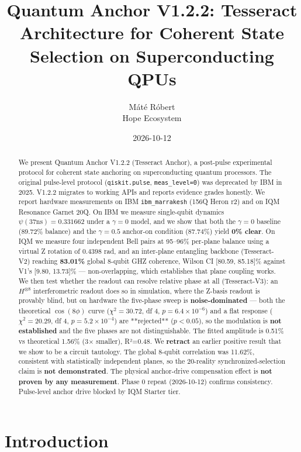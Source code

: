 \documentclass[11pt,a4paper]{article}
\title{Quantum Anchor V1.2.2: Tesseract Architecture for Coherent State Selection on Superconducting QPUs}
\author{M\'at\'e R\'obert\\Hope Ecosystem}
\date{2026-10-12}
\begin{document}
\maketitle

\begin{abstract}
We present Quantum Anchor V1.2.2 (Tesseract Anchor), a post-pulse experimental protocol for coherent state anchoring on superconducting quantum processors. The original pulse-level protocol (\texttt{qiskit.pulse}, \texttt{meas\_level=0}) was deprecated by IBM in 2025. V1.2.2 migrates to working APIs and reports evidence grades honestly. We report hardware measurements on IBM \texttt{ibm\_marrakesh} (156Q Heron r2) and on IQM Resonance Garnet 20Q. On IBM we measure single-qubit dynamics $\psi(37\text{ns}) = 0.331662$ under a $\gamma=0$ model, and we show that both the $\gamma=0$ baseline (89.72\% balance) and the $\gamma=0.5$ anchor-on condition (87.74\%) yield \textbf{0\% clear}. On IQM we measure four independent Bell pairs at 95--96\% per-plane balance using a virtual Z rotation of $0.4398$ rad, and an inter-plane entangling backbone (Tesseract-V2) reaching \textbf{83.01\%} global 8-qubit GHZ coherence, Wilson CI [80.59, 85.18]\% against V1's [9.80, 13.73]\% --- non-overlapping, which establishes that plane coupling works. We then test whether the readout can resolve relative phase at all (Tesseract-V3): an $H^{\otimes 8}$ interferometric readout does so in simulation, where the Z-basis readout is provably blind, but on hardware the five-phase sweep is \textbf{noise-dominated} --- both the theoretical $\cos(8\phi)$ curve ($\chi^2=30.72$, df 4, $p=6.4\times10^{-6}$) and a flat response ($\chi^2=20.29$, df 4, $p=5.2\times10^{-4}$) are **rejected** ($p<0.05$), so the modulation is \textbf{not established} and the five phases are not distinguishable. The fitted amplitude is 0.51\% vs theoretical 1.56\% (3$\times$ smaller), R²=0.48. We \textbf{retract} an earlier positive result that we show to be a circuit tautology. The global 8-qubit correlation was 11.62\%, consistent with statistically independent planes, so the 20-reality synchronized-selection claim is \textbf{not demonstrated}. The physical anchor-drive compensation effect is \textbf{not proven by any measurement}. Phase 0 repeat (2026-10-12) confirms consistency. Pulse-level anchor drive blocked by IQM Starter tier.
\end{abstract}

\section{Introduction}
\end{document}
